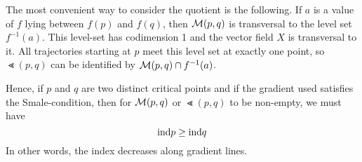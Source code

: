 \begin{remark}
    The most convenient way to consider the quotient is the following. If $a$ is a 
     value of $f$ lying between $f(p)$ and $f(q)$, then ${ \mathcal{M} }(p, q)$ 
    is transversal to the level set $f^{-1}(a)$. This level-set has codimension 1 and the 
    vector field $X$ is transversal to it. All trajectories starting at $p$ meet this level
    set at exactly one point, so $\Lt(p, q)$ can be identified by 
    ${ \mathcal{M} }(p, q) \cap f^{-1}(a)$.

    Hence, if $p$ and $q$ are two distinct critical points and if the gradient used 
    satisfies the Smale-condition, then for ${ \mathcal{M} }(p, q)$ or $\Lt(p, q)$
    to be non-empty, we must have 
    \[ { \operatorname{ind} } p \geq { \operatorname{ind} } q \]
    In other words, the index decreases along gradient lines.
\end{remark}
